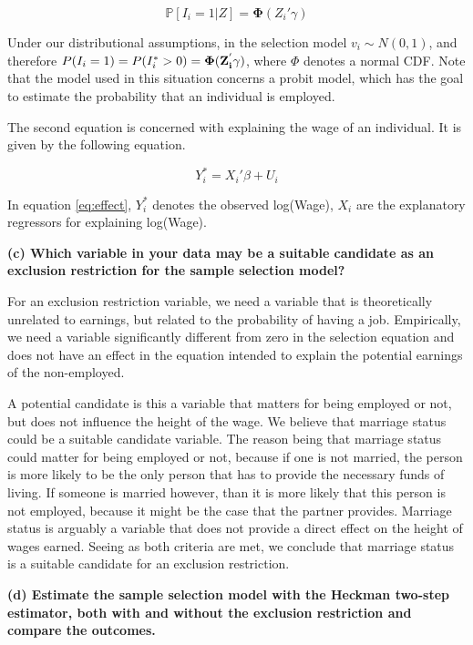 \documentclass[
]{article}
\begin{document}
\begin{equation}
\mathbb{P}[I_i=1|Z]=\mathbf{\Phi} (Z_i'\gamma)
\label{eq:select}
\end{equation}

Under our distributional assumptions, in the selection model
\(v_i \sim N(0,1)\), and therefore
\(P(I_i=1) = P(I_i^* > 0) = \bf{\Phi}(Z_i^{'} \gamma)\), where \(\Phi\)
denotes a normal CDF. Note that the model used in this situation
concerns a probit model, which has the goal to estimate the probability
that an individual is employed.

The second equation is concerned with explaining the wage of an
individual. It is given by the following equation.

\begin{equation}
Y_i^* = X_i'\beta + U_i
\label{eq:effect}
\end{equation}

In equation \ref{eq:effect}, \(Y_i^*\) denotes the observed log(Wage),
\(X_i\) are the explanatory regressors for explaining log(Wage).

\textbf{(c) Which variable in your data may be a suitable candidate as
an exclusion restriction for the sample selection model?}

For an exclusion restriction variable, we need a variable that is
theoretically unrelated to earnings, but related to the probability of
having a job. Empirically, we need a variable significantly different
from zero in the selection equation and does not have an effect in the
equation intended to explain the potential earnings of the non-employed.

A potential candidate is this a variable that matters for being employed
or not, but does not influence the height of the wage. We believe that
marriage status could be a suitable candidate variable. The reason being
that marriage status could matter for being employed or not, because if
one is not married, the person is more likely to be the only person that
has to provide the necessary funds of living. If someone is married
however, than it is more likely that this person is not employed,
because it might be the case that the partner provides. Marriage status
is arguably a variable that does not provide a direct effect on the
height of wages earned. Seeing as both criteria are met, we conclude
that marriage status is a suitable candidate for an exclusion
restriction.

\textbf{(d) Estimate the sample selection model with the Heckman
two-step estimator, both with and without the exclusion restriction and
compare the outcomes.}
\end{document}
